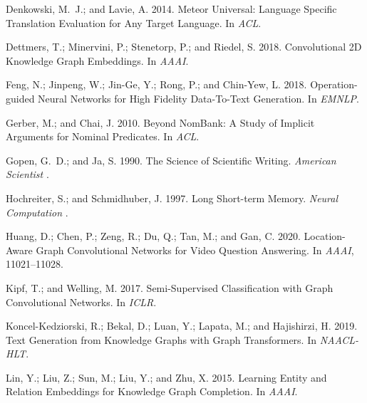 \documentclass[letterpaper]{article}
\begin{document}
\begin{thebibliography}{43}
Denkowski, M.~J.; and Lavie, A. 2014.
\newblock Meteor Universal: Language Specific Translation Evaluation for Any
  Target Language.
\newblock In \emph{ACL}.

Dettmers, T.; Minervini, P.; Stenetorp, P.; and Riedel, S. 2018.
\newblock Convolutional 2D Knowledge Graph Embeddings.
\newblock In \emph{AAAI}.

Feng, N.; Jinpeng, W.; Jin-Ge, Y.; Rong, P.; and Chin-Yew, L. 2018.
\newblock Operation-guided Neural Networks for High Fidelity Data-To-Text
  Generation.
\newblock In \emph{EMNLP}.

Gerber, M.; and Chai, J. 2010.
\newblock Beyond {N}om{B}ank: A Study of Implicit Arguments for Nominal
  Predicates.
\newblock In \emph{ACL}.

Gopen, G.~D.; and Ja, S. 1990.
\newblock The Science of Scientific Writing.
\newblock \emph{American Scientist} .

Hochreiter, S.; and Schmidhuber, J. 1997.
\newblock Long Short-term Memory.
\newblock \emph{Neural Computation} .

Huang, D.; Chen, P.; Zeng, R.; Du, Q.; Tan, M.; and Gan, C. 2020.
\newblock Location-Aware Graph Convolutional Networks for Video Question
  Answering.
\newblock In \emph{AAAI}, 11021--11028.

Kipf, T.; and Welling, M. 2017.
\newblock Semi-Supervised Classification with Graph Convolutional Networks.
\newblock In \emph{ICLR}.

Koncel-Kedziorski, R.; Bekal, D.; Luan, Y.; Lapata, M.; and Hajishirzi, H.
  2019.
\newblock Text Generation from Knowledge Graphs with Graph Transformers.
\newblock In \emph{NAACL-HLT}.

Lin, Y.; Liu, Z.; Sun, M.; Liu, Y.; and Zhu, X. 2015.
\newblock Learning Entity and Relation Embeddings for Knowledge Graph
  Completion.
\newblock In \emph{AAAI}.


\end{thebibliography}
\end{document}
